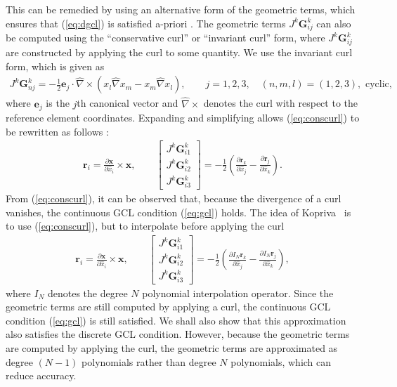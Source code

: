 \documentclass[preprint,10pt]{article}
\theoremstyle{definition}
\theoremstyle{lemma}
\theoremstyle{theorem}
\theoremstyle{assumption}
\renewcommand{\hat}{\widehat}
\newcommand{\pd}[2]{\frac{\partial#1}{\partial#2}}
\newcommand{\LRp}[1]{\left( #1 \right)}
\newcommand{\LRs}[1]{\left[ #1 \right]}
\newcommand{\Grad} {\ensuremath{\nabla}}
\begin{document}
{This can be remedied by using an alternative form of the geometric terms, which ensures that (\ref{eq:dgcl}) is satisfied a-priori \cite{visbal2002use, kopriva2006metric}.  The geometric terms $J^k\bm{G}^k_{ij}$ can also be computed using the ``conservative curl'' or ``invariant curl'' form, where $J^k\bm{G}^k_{ij}$ are constructed by applying the curl to some quantity.  We use the invariant curl form, which is given as
\begin{align}
J^k\bm{G}^k_{nj} = -\frac{1}{2}\bm{e}_j\cdot \hat{\Grad} \times \LRp{x_l\hat{\Grad}x_m - x_m\hat{\Grad}x_l}, \qquad j = 1,2,3, \quad (n,m,l) = (1,2,3), \text{ cyclic},
\label{eq:conscurl}
\end{align}
where $\bm{e}_j$ is the $j$th canonical vector and $\hat{\Grad} \times $ denotes the curl with respect to the reference element coordinates.  Expanding and simplifying allows (\ref{eq:conscurl}) to be rewritten as follows \cite{hindenlang2012explicit}:
\begin{align}
\bm{r}_i = \pd{\bm{x}}{\hat{x}_i}\times \bm{x}, \qquad
\LRs{\begin{array}{c}
J^k\bm{G}^k_{i1}\\
J^k\bm{G}^k_{i2}\\
J^k\bm{G}^k_{i3}\end{array}} = -\frac{1}{2}\LRp{\pd{\bm{r}_k}{\hat{x}_j}-\pd{\bm{r}_j}{\hat{x}_k}}.
\end{align}
From (\ref{eq:conscurl}), it can be observed that, because the divergence of a curl vanishes, the continuous GCL condition (\ref{eq:gcl}) holds.  
The idea of Kopriva~\cite{kopriva2006metric} is to use (\ref{eq:conscurl}), but to interpolate before applying the curl  %
\begin{align}
\bm{r}_i = { \pd{\bm{x}}{\hat{x}_i}\times \bm{x}}, \qquad
\LRs{\begin{array}{c}
J^k\bm{G}^k_{i1}\\
J^k\bm{G}^k_{i2}\\
J^k\bm{G}^k_{i3}\end{array}} = -\frac{1}{2}\LRp{\pd{I_N\bm{r}_k}{\hat{x}_j}-\pd{I_N\bm{r}_j}{\hat{x}_k}}, 
\label{eq:iconscurl}
\end{align}
where $I_N$ denotes the degree $N$ polynomial interpolation operator. Since the geometric terms are still computed by applying a curl, the continuous GCL condition (\ref{eq:gcl}) is still satisfied. We shall also show that this approximation also satisfies the discrete GCL condition. However, because the geometric terms are computed by applying the curl, the geometric terms are approximated as degree $(N-1)$ polynomials rather than degree $N$ polynomials, which can reduce accuracy.  

}
\end{document}
